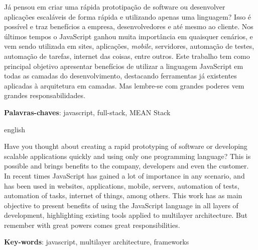 \documentclass[
	12pt,				%
	openright,			%
	twoside,			%
	a4paper,			%
	english,			%
	brazil				%
	]{abntex2}
\begin{document}

\setlength{\absparsep}{18pt} %
\begin{resumo}
Já pensou em criar uma rápida prototipação de software ou desenvolver aplicações escaláveis de forma rápida e utilizando apenas uma linguagem? Isso é possível e traz benefícios a empresa, desenvolvedores e até mesmo ao cliente. Nos últimos tempos o JavaScript ganhou muita importância em quaisquer cenários, e vem sendo utilizada em sites, aplicações, \textit{mobile}, servidores, automação de testes, automação de tarefas, internet das coisas, entre outros. Este trabalho tem como principal objetivo apresentar benefícios de utilizar a linguagem JavaScript em todas as camadas do desenvolvimento, destacando ferramentas já existentes aplicadas à arquitetura em camadas. Mas lembre-se com grandes poderes vem grandes responsabilidades.

 \vspace{\onelineskip}

 \textbf{Palavras-chaves}: javascript, full-stack, MEAN Stack
\end{resumo}

\begin{resumo}[Abstract]
 \begin{otherlanguage*}{english}

Have you thought about creating a rapid prototyping of software or developing scalable applications quickly and using only one programming language? This is possible and brings benefits to the company, developers and even the customer. In recent times JavaScript has gained a lot of importance in any scenario, and has been used in websites, applications, mobile, servers, automation of tests, automation of tasks, internet of things, among others. This work has as main objective to present benefits of using the JavaScript language in all layers of development, highlighting existing tools applied to multilayer architecture. But remember with great powers comes great responsibilities.

   \vspace{\onelineskip}
 
   \noindent 
   \textbf{Key-words}: javascript, multilayer architecture, frameworks
 \end{otherlanguage*}
\end{resumo}
\listoffigures*
\cleardoublepage
\end{document}
